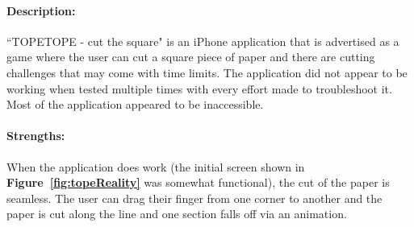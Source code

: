 \documentclass[11pt]{article}
\begin{document}
                \paragraph{Description:}
                ``TOPETOPE - cut the square" is an iPhone application that is advertised as a game where the user can cut a square piece of paper and there are cutting challenges that may come with time limits. The application did not appear to be working when tested multiple times with every effort made to troubleshoot it. Most of the application appeared to be inaccessible. 
                
                \paragraph{Strengths:}
                When the application does work (the initial screen shown in \textbf{Figure~\ref{fig:topeReality}} was somewhat functional), the cut of the paper is seamless. The user can drag their finger from one corner to another and the paper is cut along the line and one section falls off via an animation.
                
\end{document}

